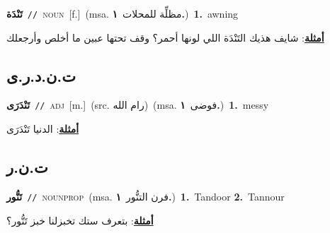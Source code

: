 \documentclass[10pt,a4paper,twoside]{article} %
\begin{document}
\begin{multicols}{2}
{\setlength\topsep{0pt}\textbf{\foreignlanguage{arabic}{تَنْدَة}}\ {\color{gray}\texttt{//}\color{black}}\ \textsc{noun}\ [f.]\ \color{gray}(msa. \foreignlanguage{arabic}{مظلِّة للمحلات}~\foreignlanguage{arabic}{\textbf{١.}})\color{black}\ \textbf{1.}~awning\  \begin{flushright}\color{gray}\foreignlanguage{arabic}{\textbf{\underline{\foreignlanguage{arabic}{أمثلة}}}: شايف هذيك التَنْدَة اللي لونها أحمر؟ وقف تحتها عبين ما أخلص وأرجعلك}\end{flushright}\color{black}} \vspace{2mm}

\vspace{-3mm}
\subsection*{\color{blue}\foreignlanguage{arabic}{ت.ن.د.ر.ى}\color{blue}{ (ntws)}} 

{\setlength\topsep{0pt}\textbf{\foreignlanguage{arabic}{تَنْدَرَى}}\ {\color{gray}\texttt{//}\color{black}}\ \textsc{adj}\ [m.]\ (src. \color{gray}\foreignlanguage{arabic}{رام الله}\color{black})\ \color{gray}(msa. \foreignlanguage{arabic}{فوضى}~\foreignlanguage{arabic}{\textbf{١.}})\color{black}\ \textbf{1.}~messy\  \begin{flushright}\color{gray}\foreignlanguage{arabic}{\textbf{\underline{\foreignlanguage{arabic}{أمثلة}}}: الدنيا تَنْدَرَى}\end{flushright}\color{black}} \vspace{2mm}

\vspace{-3mm}
\subsection*{\color{blue}\foreignlanguage{arabic}{ت.ن.ر}\color{blue}{}} 

{\setlength\topsep{0pt}\textbf{\foreignlanguage{arabic}{تَنُّور}}\ {\color{gray}\texttt{//}\color{black}}\ \textsc{noun\textunderscore prop}\ \color{gray}(msa. \foreignlanguage{arabic}{فرن التنُّور}~\foreignlanguage{arabic}{\textbf{١.}})\color{black}\ \textbf{1.}~Tandoor  \textbf{2.}~Tannour\  \begin{flushright}\color{gray}\foreignlanguage{arabic}{\textbf{\underline{\foreignlanguage{arabic}{أمثلة}}}: بتعرف ستك تخبزلنا خبز تَنُّور؟}\end{flushright}\color{black}} \vspace{2mm}


\end{multicols}
\end{document}
